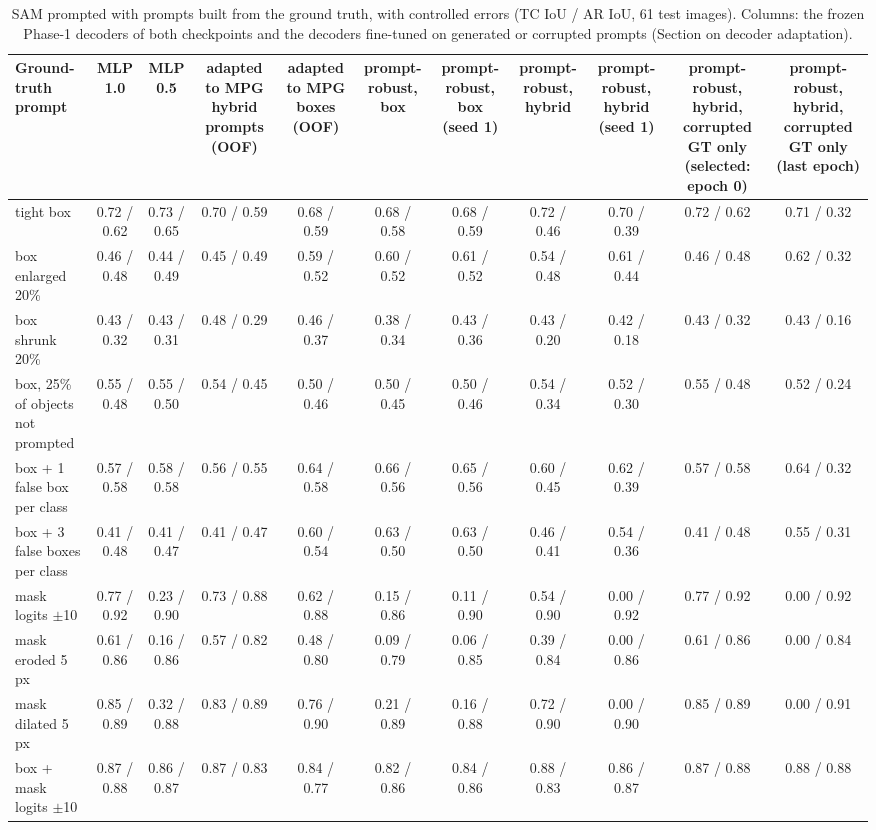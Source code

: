 \begin{table}[htbp]
\centering
\small
\begin{adjustbox}{max width=\linewidth}
\begin{tabular}{lcccccccccc}
\toprule
Ground-truth prompt & MLP 1.0 & MLP 0.5 & adapted to MPG hybrid prompts (OOF) & adapted to MPG boxes (OOF) & prompt-robust, box & prompt-robust, box (seed 1) & prompt-robust, hybrid & prompt-robust, hybrid (seed 1) & prompt-robust, hybrid, corrupted GT only (selected: epoch 0) & prompt-robust, hybrid, corrupted GT only (last epoch) \\
\midrule
tight box & 0.72 / 0.62 & 0.73 / 0.65 & 0.70 / 0.59 & 0.68 / 0.59 & 0.68 / 0.58 & 0.68 / 0.59 & 0.72 / 0.46 & 0.70 / 0.39 & 0.72 / 0.62 & 0.71 / 0.32 \\
box enlarged 20\% & 0.46 / 0.48 & 0.44 / 0.49 & 0.45 / 0.49 & 0.59 / 0.52 & 0.60 / 0.52 & 0.61 / 0.52 & 0.54 / 0.48 & 0.61 / 0.44 & 0.46 / 0.48 & 0.62 / 0.32 \\
box shrunk 20\% & 0.43 / 0.32 & 0.43 / 0.31 & 0.48 / 0.29 & 0.46 / 0.37 & 0.38 / 0.34 & 0.43 / 0.36 & 0.43 / 0.20 & 0.42 / 0.18 & 0.43 / 0.32 & 0.43 / 0.16 \\
box, 25\% of objects not prompted & 0.55 / 0.48 & 0.55 / 0.50 & 0.54 / 0.45 & 0.50 / 0.46 & 0.50 / 0.45 & 0.50 / 0.46 & 0.54 / 0.34 & 0.52 / 0.30 & 0.55 / 0.48 & 0.52 / 0.24 \\
box + 1 false box per class & 0.57 / 0.58 & 0.58 / 0.58 & 0.56 / 0.55 & 0.64 / 0.58 & 0.66 / 0.56 & 0.65 / 0.56 & 0.60 / 0.45 & 0.62 / 0.39 & 0.57 / 0.58 & 0.64 / 0.32 \\
box + 3 false boxes per class & 0.41 / 0.48 & 0.41 / 0.47 & 0.41 / 0.47 & 0.60 / 0.54 & 0.63 / 0.50 & 0.63 / 0.50 & 0.46 / 0.41 & 0.54 / 0.36 & 0.41 / 0.48 & 0.55 / 0.31 \\
mask logits $\pm$10 & 0.77 / 0.92 & 0.23 / 0.90 & 0.73 / 0.88 & 0.62 / 0.88 & 0.15 / 0.86 & 0.11 / 0.90 & 0.54 / 0.90 & 0.00 / 0.92 & 0.77 / 0.92 & 0.00 / 0.92 \\
mask eroded 5 px & 0.61 / 0.86 & 0.16 / 0.86 & 0.57 / 0.82 & 0.48 / 0.80 & 0.09 / 0.79 & 0.06 / 0.85 & 0.39 / 0.84 & 0.00 / 0.86 & 0.61 / 0.86 & 0.00 / 0.84 \\
mask dilated 5 px & 0.85 / 0.89 & 0.32 / 0.88 & 0.83 / 0.89 & 0.76 / 0.90 & 0.21 / 0.89 & 0.16 / 0.88 & 0.72 / 0.90 & 0.00 / 0.90 & 0.85 / 0.89 & 0.00 / 0.91 \\
box + mask logits $\pm$10 & 0.87 / 0.88 & 0.86 / 0.87 & 0.87 / 0.83 & 0.84 / 0.77 & 0.82 / 0.86 & 0.84 / 0.86 & 0.88 / 0.83 & 0.86 / 0.87 & 0.87 / 0.88 & 0.88 / 0.88 \\
\bottomrule
\end{tabular}
\end{adjustbox}
\caption{SAM prompted with prompts built from the ground truth, with controlled errors (TC IoU / AR IoU, 61 test images). Columns: the frozen Phase-1 decoders of both checkpoints and the decoders fine-tuned on generated or corrupted prompts (Section on decoder adaptation).}
\label{tab:oracle_prompts}
\end{table}
